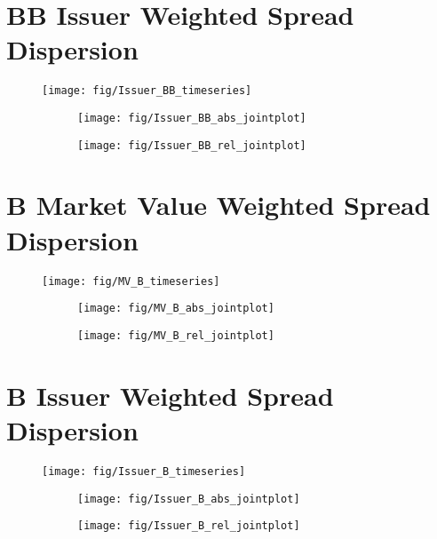 \documentclass[12pt]{article}
\begin{document}
\section{BB Issuer Weighted Spread Dispersion}
\begin{figure}[H]
	\centering
	\texttt{[image: fig/Issuer\_BB\_timeseries]}
\end{figure}
\begin{figure}[H]
	\begin{subfigure}[t]{0.48\textwidth}
		\centering
		\texttt{[image: fig/Issuer\_BB\_abs\_jointplot]}
	\end{subfigure}
	\hfill
	\begin{subfigure}[t]{0.48\textwidth}
		\centering
		\texttt{[image: fig/Issuer\_BB\_rel\_jointplot]}
	\end{subfigure}
\end{figure}
\pagebreak

\section{B Market Value Weighted Spread Dispersion}
\begin{figure}[H]
	\centering
	\texttt{[image: fig/MV\_B\_timeseries]}
\end{figure}
\begin{figure}[H]
	\begin{subfigure}[t]{0.48\textwidth}
		\centering
		\texttt{[image: fig/MV\_B\_abs\_jointplot]}
	\end{subfigure}
	\hfill
	\begin{subfigure}[t]{0.48\textwidth}
		\centering
		\texttt{[image: fig/MV\_B\_rel\_jointplot]}
	\end{subfigure}
\end{figure}
\pagebreak

\section{B Issuer Weighted Spread Dispersion}
\begin{figure}[H]
	\centering
	\texttt{[image: fig/Issuer\_B\_timeseries]}
\end{figure}
\begin{figure}[H]
	\begin{subfigure}[t]{0.48\textwidth}
		\centering
		\texttt{[image: fig/Issuer\_B\_abs\_jointplot]}
	\end{subfigure}
	\hfill
	\begin{subfigure}[t]{0.48\textwidth}
		\centering
		\texttt{[image: fig/Issuer\_B\_rel\_jointplot]}
	\end{subfigure}
\end{figure}
\pagebreak
\end{document}

